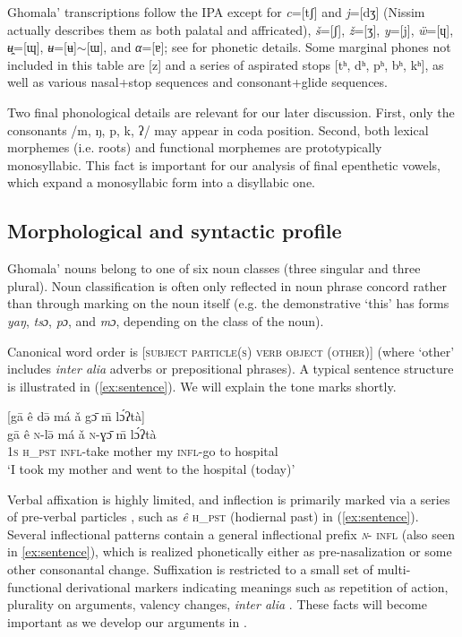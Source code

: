 \documentclass[output=paper,colorlinks,citecolor=brown,draft,draftmode]{langscibook}
\begin{document}
Ghomala' transcriptions follow the IPA except for 
    \textit{c}=[tʃ] and     \textit{j}=[dʒ] (Nissim actually describes them  as both palatal and affricated), 
    \textit{š}=[ʃ],
    \textit{ž}=[ʒ],
    \textit{y}=[j],
    \textit{ẅ}=[ɥ],
    \textit{ʉ̯}=[ɰ],
    \textit{ʉ}=[ʉ]$\sim$[ɯ], and
    \textit{α}=[ɐ]; 
see \citet[45--71]{nissim1981} for  phonetic details.
Some marginal phones not included in this table are [z] and a series of aspirated stops [tʰ, dʰ, pʰ, bʰ, kʰ], as well as various nasal+stop sequences and  consonant+glide sequences.

Two final phonological details are relevant for our later discussion. 
First, only the consonants /m, ŋ, p, k, ʔ/ may appear in coda position. 
Second, both lexical morphemes (i.e. roots) and functional morphemes are prototypically monosyllabic.
This fact is important for our analysis of final epenthetic vowels, which expand a monosyllabic form into a disyllabic one.

\subsection{Morphological and syntactic profile}\label{sec:MSprofile}
Ghomala' nouns belong to one of six noun classes (three singular and three plural).
Noun classification is often only reflected in noun phrase concord rather than through marking on the noun itself (e.g. the demonstrative `this' has forms {\textit{yaŋ}}, {\textit{tsɔ}}, {\textit{pɔ}}, and {\textit{mɔ}},
depending on the class of the noun).

Canonical word order is [\textsc{subject particle(s) verb object (other)}] (where `other' includes \textit{inter alia} adverbs or prepositional phrases).
A typical sentence structure is illustrated in (\ref{ex:sentence}). We will explain the tone marks shortly.

\begin{exe}
\ex \label{ex:sentence}
[gā ê də̄ má ǎ gɔ̄ m̄ lɔ́ʔtà]\\
\gll gā ê  \textsc{n}-lə̄ má ǎ \textsc{n}-ɣɔ̄ m̄ lɔ́ʔtà  \\
\textsc{1s} \textsc{h\_pst} \textsc{infl}-take mother my  \textsc{infl}-go to hospital\\
\glt `I took my mother and went to the hospital (today)' \citep[100]{kamdem2020}
\end{exe}

\noindent
Verbal affixation is highly limited, and  inflection is primarily marked via a series of pre-verbal particles
\citep[97--98]{kamdem2020}, such as {\textit{ê}} \textsc{h\_pst} (hodiernal past) in (\ref{ex:sentence}).
Several inflectional patterns contain a general inflectional prefix {\textsc{\textit{n}}}- \textsc{infl} 
(also seen in \ref{ex:sentence}), 
which is realized phonetically either as pre-nasalization or some other consonantal change.
Suffixation is restricted to a small set of multi-functional derivational markers indicating meanings such as repetition of action, plurality on arguments, valency changes, \textit{inter alia} \citep{mba1997}.
These facts will become important as we develop our arguments in .
\end{document}
